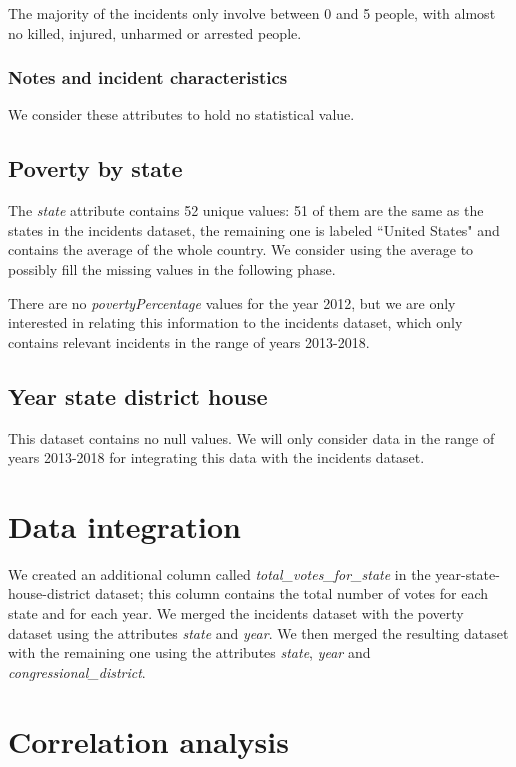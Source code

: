 \documentclass[10pt,a4paper]{report}
\begin{document}
The majority of the incidents only involve between 0 and 5 people, with almost no killed, injured, unharmed or arrested people.

\subsubsection{Notes and incident characteristics}

We consider these attributes to hold no statistical value.

\subsection{Poverty by state}

The \textit{state} attribute contains 52 unique values: 51 of them are the same as the states in the incidents dataset, the remaining one is labeled ``United States" and contains the average of the whole country.
We consider using the average to possibly fill the missing values in the following phase.

There are no \textit{povertyPercentage} values for the year 2012, but we are only interested in relating this information to the incidents dataset, which only contains relevant incidents in the range of years 2013-2018.

\subsection{Year state district house}

This dataset contains no null values.
We will only consider data in the range of years 2013-2018 for integrating this data with the incidents dataset.

\section{Data integration}

We created an additional column called \textit{total\_votes\_for\_state} in the year-state-house-district dataset; this column contains the total number of votes for each state and for each year.
We merged the incidents dataset with the poverty dataset using the attributes \textit{state} and \textit{year}.
We then merged the resulting dataset with the remaining one using the attributes \textit{state}, \textit{year} and \textit{congressional\_district}.

\section{Correlation analysis}
\end{document}
